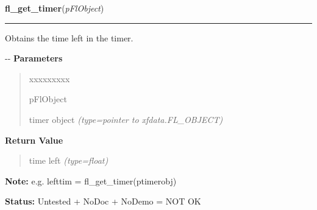 \hspace{.8\funcindent}\begin{boxedminipage}{\funcwidth}

    \raggedright \textbf{fl\_get\_timer}(\textit{pFlObject})

    \vspace{-1.5ex}

    \rule{\textwidth}{0.5\fboxrule}
\setlength{\parskip}{2ex}

Obtains the time left in the timer.

-{}-
\setlength{\parskip}{1ex}
      \textbf{Parameters}
      \vspace{-1ex}

      \begin{quote}
        \begin{Ventry}{xxxxxxxxx}

          \item[pFlObject]


timer object
            {\it (type=pointer to xfdata.FL\_OBJECT)}

        \end{Ventry}

      \end{quote}

      \textbf{Return Value}
    \vspace{-1ex}

      \begin{quote}

time left
      {\it (type=float)}

      \end{quote}

\textbf{Note:} 
e.g. lefttim = fl\_get\_timer(ptimerobj)


\textbf{Status:} 
Untested + NoDoc + NoDemo = NOT OK


    \end{boxedminipage}

    \label{xformslib:fltimer:fl_set_timer_countup}

    \vspace{0.5ex}


